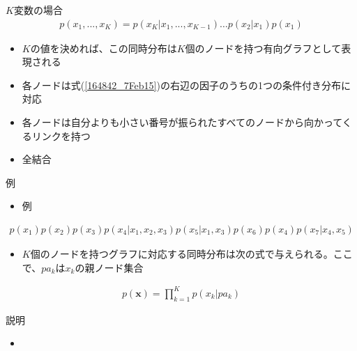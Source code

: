 \begin{frame}{$K$変数の場合}
 \begin{eqnarray}
  p(x_1,...,x_K) = p(x_K|x_1,...,x_{K-1})\dots p(x_2|x_1)p(x_1)\label{164842_7Feb15}
 \end{eqnarray}
 \begin{itemize}
  \item $K$の値を決めれば、この同時分布は$K$個のノードを持つ有向グラフとして表現される
  \item 各ノードは式(\ref{164842_7Feb15})の右辺の因子のうちの1つの条件付き分布に対応
  \item 各ノードは自分よりも小さい番号が振られたすべてのノードから向かってくるリンクを持つ
  \item 全結合
 \end{itemize}
\end{frame}

\begin{frame}{例}
 \begin{itemize}
  \item 例
 \end{itemize}
 \begin{eqnarray*}
  p(x_1)p(x_2)p(x_3)p(x_4|x_1,x_2,x_3)p(x_5|x_1,x_3)p(x_6)p(x_4)p(x_7|x_4,x_5)
 \end{eqnarray*}
 \begin{itemize}
  \item $K$個のノードを持つグラフに対応する同時分布は次の式で与えられる。ここで、$pa_k$は$x_k$の親ノード集合
 \end{itemize}
 \begin{eqnarray*}
  p(\bm{x}) = \prod_{k=1}^{K}p(x_k|pa_k)
 \end{eqnarray*}
\end{frame}

\begin{frame}{説明}
 \begin{itemize}
  \item
 \end{itemize}
\end{frame}
